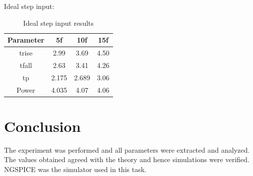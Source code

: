 \documentclass[12pt,a4paper]{article}
\begin{document}
Ideal step input:
\begin{table}[H]
\centering
\begin{tabular}{||c c c c||}
 \hline
 Parameter & 5f & 10f & 15f\\ [0.5ex] 
 \hline\hline
 trise & 2.99 & 3.69 & 4.50\\ 
 tfall & 2.63 & 3.41 & 4.26\\
 tp & 2.175 & 2.689 & 3.06\\
 Power & 4.035 & 4.07 & 4.06\\
 [0.5ex] 
 \hline
\end{tabular}
\caption{Ideal step input results}
\label{table:1}
\end{table}

\section{Conclusion}
The experiment was performed and all parameters were extracted and analyzed. The values obtained agreed with the theory and hence simulations were verified. NGSPICE was the simulator used in this task.
\end{document}
